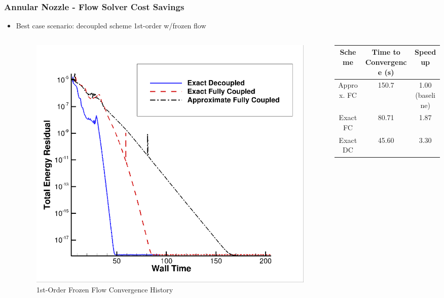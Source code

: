 \documentclass{beamer}
\begin{document}
\begin{frame}
  \frametitle{Annular Nozzle - Flow Solver Cost Savings}
  \begin{itemize}
    \item Best case scenario: decoupled scheme 1st-order w/frozen flow
      \begin{columns}
        \begin{column}{0.4\textwidth}
          \centering
          \begin{figure}[h]
            \centering
            \includegraphics[width=\textwidth]{figures/1st-order.png}
            \caption{1st-Order Frozen Flow Convergence History}
            \label{fig:1st-order}
          \end{figure}
        \end{column}
        \begin{column}{0.6\textwidth}
          \centering
          \begin{table}
            \tiny
            \centering
            \begin{tabular}{c|c|c}
              Scheme & Time to Convergence (s) & Speedup \\
              \hline
              Approx. FC & 150.7 & 1.00 (baseline) \\
              Exact FC   & 80.71 & 1.87 \\
              Exact DC   & 45.60 & 3.30 \\
            \end{tabular}

\end{table}
\end{column}
\end{columns}
\end{itemize}
\end{frame}
\end{document}
